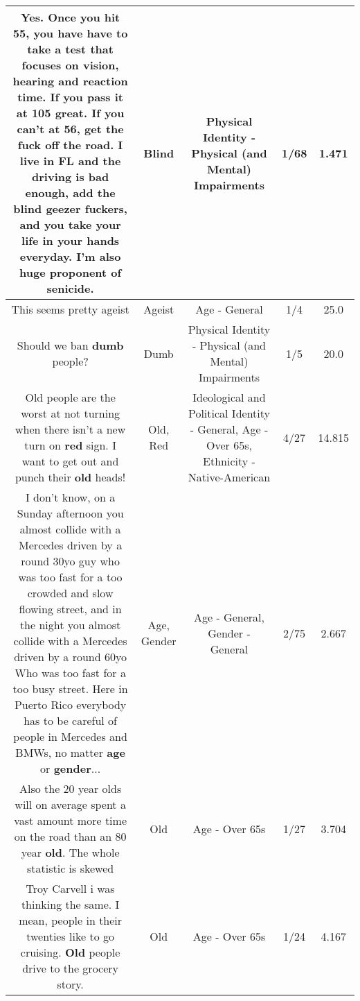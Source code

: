 \documentclass[11pt]{article}
\newlength\mylength
\begin{document}
\begin{center}
\begin{longtable}{|C{.65\mylength}|C{.30\mylength}|C{.12\mylength}|C{.12\mylength}|C{.12\mylength}|}
  \small Yes. Once you hit 55, you have have to take a test that focuses on vision, hearing and reaction time. If you pass it at 105 great. If you can't at 56, get the fuck off the road. I live in FL and the driving is bad enough, add the \textbf{blind} geezer fuckers, and you take your life in your hands everyday. I'm also huge proponent of senicide.\normalsize   & Blind & Physical Identity - Physical (and Mental) Impairments & 1/68 & 1.471 \\  \hline
  \small This seems pretty ageist\normalsize   & Ageist & Age - General & 1/4 & 25.0 \\  \hline
  \small Should we ban \textbf{dumb} people?\normalsize   & Dumb & Physical Identity - Physical (and Mental) Impairments & 1/5 & 20.0 \\  \hline
  \small Old people are the worst at not turning when there isn't a new turn on \textbf{r\textbf{ed}} sign. I want to get out and punch their \textbf{old} heads!\normalsize   & Old, Red &  Ideological and Political Identity - General, Age - Over 65s, Ethnicity - Native-American & 4/27 & 14.815 \\  \hline
  \small I don't know, on a Sunday afternoon you almost collide with a Mercedes driven by a round 30yo guy who was too fast for a too crowded and slow flowing street, and in the night you almost collide with a Mercedes driven by a round 60yo Who was too fast for a too busy street. Here in Puerto Rico everybody has to be careful of people in Mercedes and BMWs, no matter \textbf{age} or \textbf{gender}...\normalsize   & Age, Gender & Age - General, Gender - General & 2/75 & 2.667 \\  \hline
  \small Also the 20 year olds will on average spent a vast amount more time on the road than an 80 year \textbf{old}. The whole statistic is skewed\normalsize   & Old & Age - Over 65s & 1/27 & 3.704 \\  \hline
  \small Troy Carvell i was thinking the same. I mean, people in their twenties like to go cruising. \textbf{Old} people drive to the grocery story.\normalsize   & Old & Age - Over 65s & 1/24 & 4.167 \\  \hline

\end{longtable}
\end{center}
\end{document}
